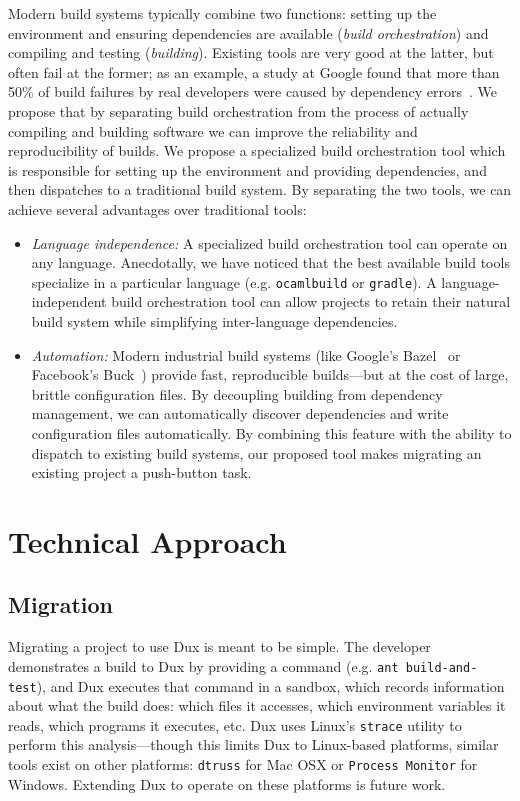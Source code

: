 \documentclass[10pt,conference]{IEEEtran}
\begin{document}
                Modern build systems typically combine two functions:
setting up the environment and ensuring dependencies are available (\textit{build orchestration})
and compiling and testing (\textit{building}).
Existing tools are very good at the latter, but often fail at the former;
as an example, a study at Google found that more than 50\% of build failures
by real developers were caused by dependency errors~\cite{googlebuilderrors}.
We propose that by separating build orchestration from the process of actually
compiling and building software we can improve the reliability and reproducibility of builds.
We propose a specialized build orchestration tool which is responsible for setting up the environment
and providing dependencies, and then dispatches to a traditional build system.
By separating the two tools, we can achieve several advantages over traditional tools:
\begin{itemize}
\item{
\textit{Language independence:}
A specialized build orchestration tool can operate on any language.
Anecdotally, we have noticed that the best available build tools specialize
in a particular language (e.g. \texttt{ocamlbuild} or \texttt{gradle}).
A language-independent build orchestration tool can allow projects to retain
their natural build system while simplifying inter-language dependencies.
}
\item{
\textit{Automation:}
Modern industrial build systems (like Google's Bazel~\cite{blaze} or Facebook's Buck~\cite{buck}) provide fast,
reproducible builds---but at the cost of large, brittle configuration files.
By decoupling building from dependency management, we can automatically
discover dependencies and write configuration files automatically.
By combining this feature with the ability to dispatch to existing build systems,
our proposed tool makes migrating an existing project a push-button task.
}
\end{itemize}

\section{Technical Approach}

\subsection{Migration}

Migrating a project to use Dux is meant to be simple.
The developer demonstrates a build to Dux by providing a command (e.g. \texttt{ant build-and-test}),
and Dux executes that command in a sandbox, which records information about what the build does:
which files it accesses, which environment variables it reads, which programs it executes, etc.
Dux uses Linux's \texttt{strace} utility to perform this analysis---though this limits Dux to
Linux-based platforms, similar tools exist on other platforms: \texttt{dtruss} for Mac OSX or
\texttt{Process Monitor} for Windows. Extending Dux to operate on these platforms is future work.
\end{document}
